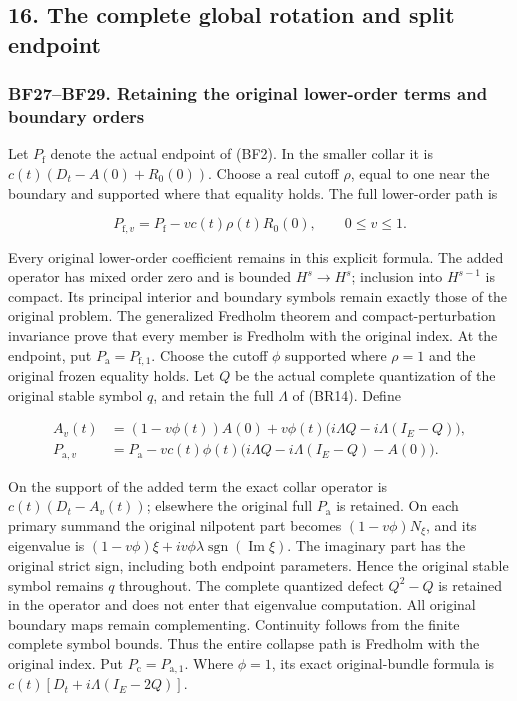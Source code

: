 \documentclass[
  11pt,
]{article}
\begin{document}
\subsection{16. The complete global rotation and split
endpoint}\label{stable-global-rotation-proof}

\subsubsection{BF27--BF29. Retaining the original lower-order terms and
boundary
orders}\label{bf27bf29.-retaining-the-original-lower-order-terms-and-boundary-orders}

Let \(P_{\mathrm f}\) denote the actual endpoint of (BF2). In the
smaller collar it is \(c(t)(D_t-A(0)+R_0(0))\). Choose a real cutoff
\(\rho\), equal to one near the boundary and supported where that
equality holds. The full lower-order path is

\[
 P_{\mathrm f,v}=P_{\mathrm f}-v c(t)\rho(t)R_0(0),
 \qquad 0\le v\le1.
 \tag{BF27}
\]

Every original lower-order coefficient remains in this explicit formula.
The added operator has mixed order zero and is bounded \(H^s\to H^s\);
inclusion into \(H^{s-1}\) is compact. Its principal interior and
boundary symbols remain exactly those of the original problem. The
generalized Fredholm theorem and compact-perturbation invariance prove
that every member is Fredholm with the original index. At the endpoint,
put \(P_{\mathrm a}=P_{\mathrm f,1}\). Choose the cutoff \(\phi\)
supported where \(\rho=1\) and the original frozen equality holds. Let
\(Q\) be the actual complete quantization of the original stable symbol
\(q\), and retain the full \(\Lambda\) of (BR14). Define

\[
 \begin{split}
 A_v(t)&=(1-v\phi(t))A(0)
            +v\phi(t)\bigl(i\Lambda Q-i\Lambda(I_E-Q)\bigr),\\
 P_{\mathrm a,v}&=P_{\mathrm a}
       -v c(t)\phi(t)\bigl(i\Lambda Q-i\Lambda(I_E-Q)-A(0)\bigr).
 \end{split}
 \tag{BF28}
\]

On the support of the added term the exact collar operator is
\(c(t)(D_t-A_v(t))\); elsewhere the original full \(P_{\mathrm a}\) is
retained. On each primary summand the original nilpotent part becomes
\((1-v\phi)N_\xi\), and its eigenvalue is
\((1-v\phi)\xi+iv\phi\lambda\operatorname{sgn}(\operatorname{Im}\xi)\).
The imaginary part has the original strict sign, including both endpoint
parameters. Hence the original stable symbol remains \(q\) throughout.
The complete quantized defect \(Q^2-Q\) is retained in the operator and
does not enter that eigenvalue computation. All original boundary maps
remain complementing. Continuity follows from the finite complete symbol
bounds. Thus the entire collapse path is Fredholm with the original
index. Put \(P_{\mathrm c}=P_{\mathrm a,1}\). Where \(\phi=1\), its
exact original-bundle formula is \(c(t)[D_t+i\Lambda(I_E-2Q)]\).
\end{document}
